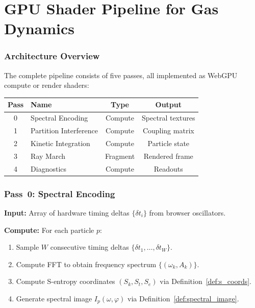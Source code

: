 \documentclass[twocolumn,10pt,a4paper]{article}
\theoremstyle{plain}
\theoremstyle{definition}
\theoremstyle{remark}
\newcommand{\Sk}{S_k}
\newcommand{\St}{S_t}
\newcommand{\Se}{S_e}
\begin{document}

\part{GPU Shader Pipeline for Gas Dynamics}
\label{part:pipeline}

\section{Architecture Overview}
\label{sec:architecture}

The complete pipeline consists of five passes, all implemented as WebGPU compute or render shaders:

\begin{center}
\begin{tabular}{clcc}
\toprule
\textbf{Pass} & \textbf{Name} & \textbf{Type} & \textbf{Output} \\
\midrule
0 & Spectral Encoding      & Compute & Spectral textures \\
1 & Partition Interference  & Compute & Coupling matrix \\
2 & Kinetic Integration     & Compute & Particle state \\
3 & Ray March               & Fragment & Rendered frame \\
4 & Diagnostics             & Compute & Readouts \\
\bottomrule
\end{tabular}
\end{center}

\section{Pass~0: Spectral Encoding}
\label{sec:pass0}

\textbf{Input:} Array of hardware timing deltas $\{\delta t_i\}$ from browser oscillators.

\textbf{Compute:} For each particle $p$:
\begin{enumerate}
    \item Sample $W$ consecutive timing deltas $\{\delta t_1, \ldots, \delta t_W\}$.
    \item Compute FFT to obtain frequency spectrum $\{(\omega_k, A_k)\}$.
    \item Compute S-entropy coordinates $(\Sk, \St, \Se)$ via Definition~\ref{def:s_coords}.
    \item Generate spectral image $I_p(\omega, \varphi)$ via Definition~\ref{def:spectral_image}.
\end{enumerate}
\end{document}
